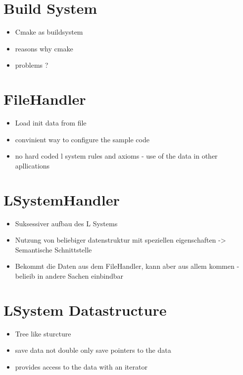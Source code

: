 \documentclass[english]{cpp-hmwk}
\begin{document}
\section{Build System}
\begin{itemize}
	\item Cmake as buildsystem
	\item reasons why cmake
	\item problems ?
\end{itemize}



\section{FileHandler}

\begin{itemize}
	\item Load init data from file
	\item convinient way to configure the sample code
	\item no hard coded l system rules and axioms - use of the data in other apllications
\end{itemize}

\section{LSystemHandler}

\begin{itemize}
	\item Suksessiver aufbau des L Systems
	\item Nutzung von beliebiger datenstruktur mit speziellen eigenschaften -> Semantische Schnittstelle
	\item Bekommt die Daten aus dem FileHandler, kann aber aus allem kommen - belieib in andere Sachen einbindbar
\end{itemize}

\section{LSystem Datastructure}

\begin{itemize}
	\item Tree like sturcture
	\item save data not double only save pointers to the data
	\item provides access to the data with an iterator
\end{itemize}
\end{document}
